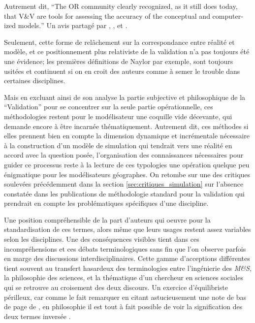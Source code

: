 Autrement dit, \foreignquote{english}{The OR community clearly recognized, as it still does today, that V\&V are tools for assessing the accuracy of the conceptual and computerized models.} Un avis partagé par \textcite{Kleijnen1995} , \textcite{Balci1998}, et \textcite{Sargent2010} .

Seulement, cette forme de relâchement sur la correspondance entre réalité et modèle, et ce positionnement plus relativiste de la validation n'a pas toujours été une évidence; les premières définitions de Naylor par exemple, sont toujours usitées et continuent si on en croit des auteurs comme \textcite{Kleindorfer1998} à semer le trouble dans certaines disciplines.

Mais en excluant ainsi de son analyse la partie subjective et philosophique de la \enquote{Validation}  pour se concentrer sur la seule partie opérationnelle, ces méthodologies restent pour le modélisateur une coquille vide décevante, qui demande encore à être incarnée thématiquement. Autrement dit, ces méthodes si elles prennent bien en compte la dimension dynamique et incrémentale nécessaire à la construction d'un modèle de simulation qui tendrait vers une réalité en accord avec la question posée, l'organisation des connaissances nécessaires pour guider ce processus reste à la lecture de ces typologies une opération quelque peu énigmatique pour les modélisateurs géographes. On retombe sur une des critiques soulevées précédemment dans la section \ref{sec:critiques_simulation} sur l'absence constatée dans les publications de méthodologie standard pour la validation qui prendrait en compte les problématiques spécifiques d'une discipline.

Une position compréhensible de la part d'auteurs qui oeuvre pour la standardisation de ces termes, alors même que leurs usages restent assez variables selon les disciplines. Une des conséquences visibles tient dans ces incompréhensions et ces débats terminologiques sans fin \autocites{David2009, Augusiak2014} que l'on observe parfois en marge des discussions interdisciplinaires. Cette gamme d'acceptions différentes tient souvent au transfert hasardeux des terminologies entre l'ingénierie des \textit{M\&S}, la philosophie des sciences, et la thématique d'un chercheur en sciences sociales qui se retrouve au croisement des deux discours. Un exercice d'équilibriste périlleux, car comme le fait remarquer \textcite{Kleijnen1995} en citant astucieusement une note de bas de page de \textcite{Barlas1990}, en philosophie il est tout à fait possible de voir la signification des deux termes inversée .

